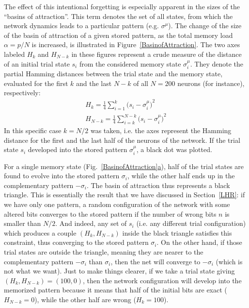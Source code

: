 The effect of this intentional forgetting is especially apparent in the sizes of the ``basins of attraction''. This term denotes the set of all states, from which the network dynamics leads to a particular pattern (e.g. $\sigma^\mu$). The change of the size of the basin of attraction of a given stored pattern, as the total memory load $\alpha=p/N$ is increased, is illustrated in Figure~\ref{BasinofAttraction}. The two axes labeled $H_k$ and $H_{N-k}$ in these figures represent a crude measure of the distance of an initial trial state $s_i$ from the considered memory state $\sigma_i^\mu$. They denote the partial Hamming distances between the trial state and the memory state, evaluated for the first $k$ and the last $N-k$ of all $N=200$ neurons (for instance), respectively:
\begin{gather}
H_{k}=\frac{1}{4}\sum_{i=1}^{k}{\bigl(s_i-\sigma_i^\mu\bigr)}^2\\
H_{N-k}=\frac{1}{4}\sum_{i=k}^{N-k}{\bigl(s_i-\sigma_i^\mu\bigr)}^2
\end{gather}
In this specific case $k=N/2$ was taken, i.e. the axes represent the Hamming distance for the first and the last half of the neurons of the network. If the trial state $s_i$ developed into the stored pattern $\sigma_i^\mu$, a black dot was plotted.

For a single memory state (Fig.~\hyperref[BasinofAttraction]{\ref*{BasinofAttraction}a}), half of the trial states are found to evolve into the stored pattern $\sigma_i$, while the other half ends up in the complementary pattern $-\sigma_i$. The basin of attraction thus represents a black triangle. This is essentially the result that we have discussed in Section~\ref{LHR}: if we have only one pattern, a random configuration of the network with some altered bits converges to the stored pattern if the number of wrong bits $n$ is smaller than $N/2$. And indeed, any set of $s_i$ (i.e. any different trial configuration) which produces a couple $(H_k,H_{N-k})$ inside the black triangle satisfies this constraint, thus converging to the stored pattern $\sigma_i$. On the other hand, if those trial states are outside the triangle, meaning they are nearer to the complementary pattern $-\sigma_i$ than $\sigma_i$, then the net will converge to $-\sigma_i$ (which is not what we want). Just to make things clearer, if we take a trial state giving $(H_k,H_{N-k})=(100,0)$, then the network configuration will develop into the memorized pattern because it means that half of the initial bits are exact ($H_{N-k}=0$), while the other half are wrong ($H_{k}=100$).

